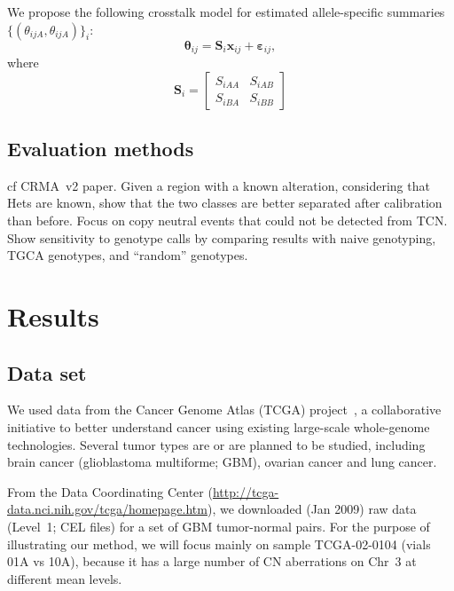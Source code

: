 \documentclass[10pt]{bmc_article}
\newenvironment{bmcformat}{\fussy\setboolean{publ}{true}}{\fussy}
\newcommand{\bx}{\mathbf{x}\xspace}
\newcommand{\bS}{\mathbf{S}\xspace}
\newcommand{\beps}{\bm{\varepsilon}\xspace}
\newcommand{\btheta}{\bm{\theta}\xspace}
\begin{document}
\begin{bmcformat}
We propose the following crosstalk model for estimated allele-specific summaries $\{(\theta_{ijA},\theta_{ijA})\}_i$:
\begin{equation}
  \btheta_{ij} = \bS_i \bx_{ij} + \beps_{ij},
  \label{eqnACCi}
\end{equation}
where 
\begin{equation}
 \bS_i = 
 \begin{bmatrix}
   S_{iAA} & S_{iAB} \\
   S_{iBA} & S_{iBB}
 \end{bmatrix}
  \label{eqnACCii}
\end{equation}


\subsection*{Evaluation methods}
\label{secEvaluation}
cf CRMA~v2 paper. Given a region with a known alteration, considering that Hets are known, show that the two classes are better separated after calibration than before. Focus on copy neutral events that could not be detected from TCN.\\

Show sensitivity to genotype calls by comparing results with naive genotyping, TGCA genotypes, and ``random'' genotypes.

\section*{Results}
\label{secResults}

\subsection*{Data set}
We used data from the  Cancer Genome Atlas (TCGA) project~\cite{CollinsBarker_2007,TCGA_2008c}, a collaborative initiative to better understand cancer using existing large-scale whole-genome technologies.  Several tumor types are or are planned to be studied, including brain cancer (glioblastoma multiforme; GBM), ovarian cancer and lung cancer. 
 
From the Data Coordinating Center (\url{http://tcga-data.nci.nih.gov/tcga/homepage.htm}), we downloaded (Jan 2009) raw data (Level~1; CEL files) for a set of GBM tumor-normal pairs.
For the purpose of illustrating our method, we will focus mainly on sample TCGA-02-0104 (vials 01A vs 10A), because it has a large number of CN aberrations on Chr~3 at different mean levels.


\end{bmcformat}
\end{document}
